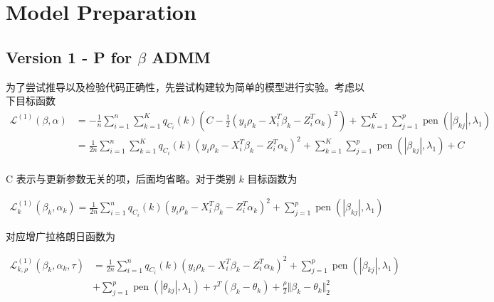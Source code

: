 \documentclass[12pt, a4paper, oneside]{article}
\numberwithin{equation}{section}
\begin{document}
\section{Model Preparation}

\subsection{Version 1 - P for $\beta$ ADMM}

为了尝试推导以及检验代码正确性，先尝试构建较为简单的模型进行实验。考虑以下目标函数
\begin{equation}
\begin{aligned}
	\mathcal{L}^{(1)}(\beta,\alpha) &= -\frac1n\sum_{i=1}^{n}\sum^{K}_{k=1} q_{C_i}(k)\left(C-\frac{1}{2}(y_i\rho_k - X_i^T \beta_k - Z_i^T \alpha_k)^2 \right) + \sum_{k=1}^{K}\sum_{j=1}^{p} \operatorname{pen}\left(|\beta_{kj}|, \lambda_{1}\right) \\
	&= \frac{1}{2n}\sum_{i=1}^{n}\sum^{K}_{k=1} q_{C_i}(k)\left(y_i\rho_k - X_i^T \beta_k - Z_i^T \alpha_k \right)^2 + \sum_{k=1}^{K}\sum_{j=1}^{p} \operatorname{pen}\left(|\beta_{kj}|, \lambda_{1}\right) + C \\
\end{aligned}
\end{equation}

C 表示与更新参数无关的项，后面均省略。对于类别 $k$ 目标函数为

\begin{equation}
	\begin{aligned}
		\mathcal{L}_k^{(1)}(\beta_k,\alpha_k)=\frac{1}{2n}\sum_{i=1}^{n} q_{C_i}(k)\left(y_i\rho_k - X_i^T \beta_k - Z_i^T \alpha_k \right)^2 + \sum_{j=1}^{p} \operatorname{pen}\left(|\beta_{kj}|, \lambda_{1}\right)
	\end{aligned}
\end{equation}

对应增广拉格朗日函数为

\begin{equation}
	\begin{aligned}
		\mathcal{L}_{k,\rho}^{(1)}(\beta_k,\alpha_k,\tau) &=\frac{1}{2n}\sum_{i=1}^{n} q_{C_i}(k)\left(y_i\rho_k - X_i^T \beta_k - Z_i^T \alpha_k \right)^2 + \sum_{j=1}^{p} \operatorname{pen}\left(|\beta_{kj}|, \lambda_{1}\right) \\
		& + \sum_{j=1}^{p}\operatorname{pen}\left(|\theta_{kj}|, \lambda_{1}\right)
		+ \tau^T (\beta_k - \theta_k) + \frac{\rho}{2}\Vert\beta_k - \theta_k\Vert_2^2
	\end{aligned}
\label{eq:auglagrange_k}
\end{equation}
\end{document}
